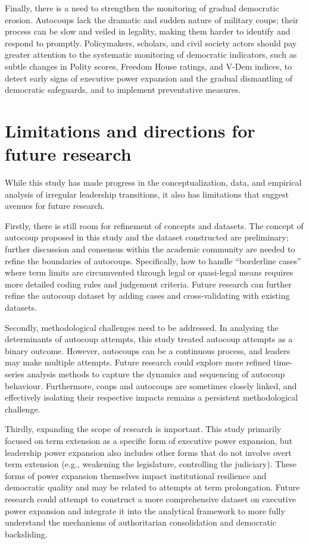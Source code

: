 \documentclass[
  12pt,
]{report}
\begin{document}
Finally, there is a need to strengthen the monitoring of gradual
democratic erosion. Autocoups lack the dramatic and sudden nature of
military coups; their process can be slow and veiled in legality, making
them harder to identify and respond to promptly. Policymakers, scholars,
and civil society actors should pay greater attention to the systematic
monitoring of democratic indicators, such as subtle changes in Polity
scores, Freedom House ratings, and V-Dem indices, to detect early signs
of executive power expansion and the gradual dismantling of democratic
safeguards, and to implement preventative measures.

\section{Limitations and directions for future
research}\label{limitations-and-directions-for-future-research}

While this study has made progress in the conceptualization, data, and
empirical analysis of irregular leadership transitions, it also has
limitations that suggest avenues for future research.

Firstly, there is still room for refinement of concepts and datasets.
The concept of autocoup proposed in this study and the dataset
constructed are preliminary; further discussion and consensus within the
academic community are needed to refine the boundaries of autocoups.
Specifically, how to handle ``borderline cases'' where term limits are
circumvented through legal or quasi-legal means requires more detailed
coding rules and judgement criteria. Future research can further refine
the autocoup dataset by adding cases and cross-validating with existing
datasets.

Secondly, methodological challenges need to be addressed. In analysing
the determinants of autocoup attempts, this study treated autocoup
attempts as a binary outcome. However, autocoups can be a continuous
process, and leaders may make multiple attempts. Future research could
explore more refined time-series analysis methods to capture the
dynamics and sequencing of autocoup behaviour. Furthermore, coups and
autocoups are sometimes closely linked, and effectively isolating their
respective impacts remains a persistent methodological challenge.

Thirdly, expanding the scope of research is important. This study
primarily focused on term extension as a specific form of executive
power expansion, but leadership power expansion also includes other
forms that do not involve overt term extension (e.g., weakening the
legislature, controlling the judiciary). These forms of power expansion
themselves impact institutional resilience and democratic quality and
may be related to attempts at term prolongation. Future research could
attempt to construct a more comprehensive dataset on executive power
expansion and integrate it into the analytical framework to more fully
understand the mechanisms of authoritarian consolidation and democratic
backsliding.
\end{document}
